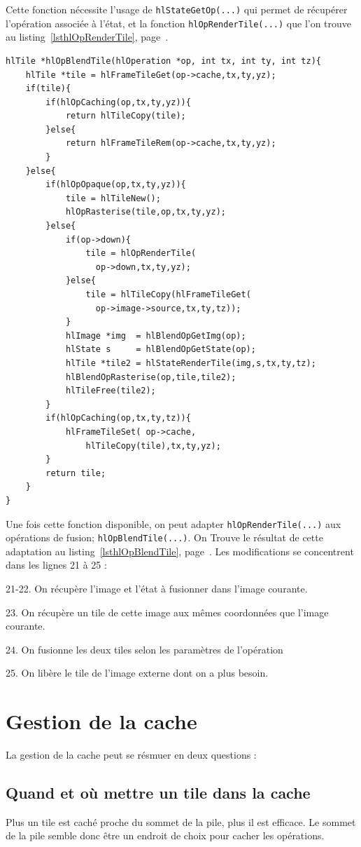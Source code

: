 		Cette fonction nécessite l'usage de \lstinline$hlStateGetOp(...)$ qui permet de récupérer l'opération associée à l'état, et la fonction
		\lstinline$hlOpRenderTile(...)$ que l'on trouve au listing~\ref{lsthlOpRenderTile}, page~\pageref{lsthlOpRenderTile}.
		\begin{lstlisting}[float,caption={Rasterisation d'opérations},frame=tb,label=lsthlOpBlendTile]
hlTile *hlOpBlendTile(hlOperation *op, int tx, int ty, int tz){
	hlTile *tile = hlFrameTileGet(op->cache,tx,ty,yz);
	if(tile){
		if(hlOpCaching(op,tx,ty,yz)){
			return hlTileCopy(tile);
		}else{
			return hlFrameTileRem(op->cache,tx,ty,yz);
		}
	}else{
		if(hlOpOpaque(op,tx,ty,yz)){
			tile = hlTileNew();
			hlOpRasterise(tile,op,tx,ty,yz);
		}else{
			if(op->down){
				tile = hlOpRenderTile(
				  op->down,tx,ty,yz);
			}else{
				tile = hlTileCopy(hlFrameTileGet(
				  op->image->source,tx,ty,tz));
			}
			hlImage *img  = hlBlendOpGetImg(op);
			hlState s     = hlBlendOpGetState(op);
			hlTile *tile2 = hlStateRenderTile(img,s,tx,ty,tz);
			hlBlendOpRasterise(op,tile,tile2);
			hlTileFree(tile2);
		}
		if(hlOpCaching(op,tx,ty,tz)){
			hlFrameTileSet(	op->cache,
				hlTileCopy(tile),tx,ty,yz);
		}
		return tile;
	}
}
	\end{lstlisting}
		Une fois cette fonction disponible, on peut adapter \lstinline$hlOpRenderTile(...)$ aux opérations de fusion; \lstinline$hlOpBlendTile(...)$.
		On Trouve le résultat de cette adaptation au listing~\ref{lsthlOpBlendTile}, page~\pageref{lsthlOpBlendTile}. Les modifications se concentrent
		dans les lignes 21 à 25 :
		\begin{description}
			\item{21-22.} On récupère l'image et l'état à fusionner dans l'image courante.
			\item{23.} On récupère un tile de cette image aux mêmes coordonnées que l'image courante.
			\item{24.} On fusionne les deux tiles selon les paramètres de l'opération
			\item{25.} On libère le tile de l'image externe dont on a plus besoin. 
		\end{description}

	\section{Gestion de la cache}
		La gestion de la cache peut se résmuer en deux questions :
		\subsection{Quand et où mettre un tile dans la cache}
			Plus un tile est caché proche du sommet de la pile, plus il est efficace. Le sommet de la pile semble donc
			être un endroit de choix pour cacher les opérations. 


